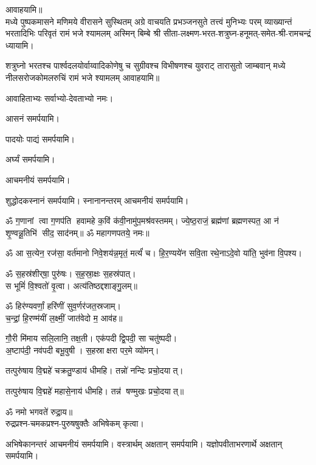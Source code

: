\begin{center}
आवाहयामि॥\\

{मध्ये पुष्पकमासने मणिमये वीरासने सुस्थितम्}
{अग्रे वाचयति प्रभञ्जनसुते तत्त्वं मुनिभ्यः परम्}
{व्याख्यान्तं भरतादिभिः परिवृतं रामं भजे श्यामलम्}
अस्मिन् बिम्बे श्री सीता-लक्ष्मण-भरत-शत्रुघ्न-हनूमत्-समेत-श्री-रामचन्द्रं ध्यायामि। 

{शत्रुघ्नो भरतश्च पार्श्वदलयोर्वाय्वादिकोणेषु च}
{सुग्रीवश्च विभीषणश्च युवराट् तारासुतो जाम्बवान्}
{मध्ये नीलसरोजकोमलरुचिं रामं भजे श्यामलम्}
आवाहयामि॥\\\medskip

आवाहिताभ्यः सर्वाभ्यो-देवताभ्यो नमः।

आसनं समर्पयामि।

पादयोः पाद्यं समर्पयामि।

अर्घ्यं समर्पयामि।

आचमनीयं समर्पयामि।

शुद्धोदकस्नानं समर्पयामि। स्नानानन्तरम् आचमनीयं समर्पयामि।



ॐ ग॒णानां त्वा ग॒णप॑ति हवामहे क॒विं क॑वी॒नामु॑प॒मश्र॑\-वस्तमम्। 
ज्ये॒ष्ठ॒राजं॒ ब्रह्म॑णां ब्रह्मणस्पत॒ आ न॑ शृ॒ण्वन्नू॒तिभि॑ सीद॒ साद॑नम्॥ 
ॐ महागणपतये॒ नमः॥ 

ॐ आ स॒त्येन॒ रज॑सा॒ वर्त॑मानो निवे॒शय॑न्न॒मृतं॒ मर्त्यं॑ च। हि॒र॒ण्यये॑न सवि॒ता रथे॒नाऽदे॒वो या॑ति॒ भुव॑ना वि॒पश्य\sn{}।

ॐ स॒हस्र॑शीर्‌षा॒ पुरु॑षः। स॒ह॒स्रा॒क्षः स॒हस्र॑पात्।\\
स भूमिं॑ वि॒श्वतो॑ वृ॒त्वा। अत्य॑तिष्ठद्दशाङ्गु॒लम्॥

ॐ हिर॑ण्यवर्णां॒ हरि॑णीं सुव॒र्णर॑जत॒स्रजाम्।\\
च॒न्द्रां॒ हि॒रण्म॑यीं ल॒क्ष्मीं॒ जात॑वेदो म॒ आव॑ह॥

गौ॒री मि॑माय सलि॒लानि॒ तक्ष॒ती। एक॑पदी द्वि॒पदी॒ सा चतु॑ष्पदी।\\
अ॒ष्टाप॑दी॒ नव॑पदी बभू॒वुषी। स॒हस्राक्षरा पर॒मे व्यो॑मन्।

तत्पुरु॑षाय वि॒द्महे॑ चक्रतु॒ण्डाय॑ धीमहि। तन्नो॑ नन्दिः प्रचो॒दयात्। 

तत्पुरु॑षाय वि॒द्महे॑ महासे॒नाय॑ धीमहि। तन्न॑ षण्मुखः प्रचो॒दयात्॥


ॐ नमो भगवते॑ रुद्रा॒य॥\\
रुद्रप्रश्न-चमकप्रश्न-पुरुषषुक्तैः अभिषेकम् कृत्वा।

अभिषेकानन्तरं आचमनीयं समर्पयामि। वस्त्रार्थम् अक्षतान् समर्पयामि। यज्ञोपवीताभरणार्थे अक्षतान् समर्पयामि।


\end{center}
